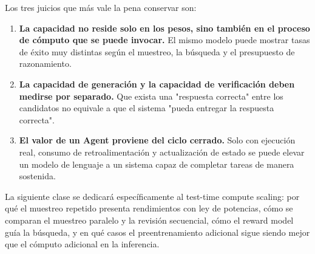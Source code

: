 \documentclass[a4paper]{article}
\begin{document}
Los tres juicios que más vale la pena conservar son:

\begin{enumerate}
    \item \textbf{La capacidad no reside solo en los pesos, sino también en el proceso de cómputo que se puede invocar.} El mismo modelo puede mostrar tasas de éxito muy distintas según el muestreo, la búsqueda y el presupuesto de razonamiento.
    \item \textbf{La capacidad de generación y la capacidad de verificación deben medirse por separado.} Que exista una "respuesta correcta" entre los candidatos no equivale a que el sistema "pueda entregar la respuesta correcta".
    \item \textbf{El valor de un Agent proviene del ciclo cerrado.} Solo con ejecución real, consumo de retroalimentación y actualización de estado se puede elevar un modelo de lenguaje a un sistema capaz de completar tareas de manera sostenida.
\end{enumerate}

La siguiente clase se dedicará específicamente al test-time compute scaling: por qué el muestreo repetido presenta rendimientos con ley de potencias, cómo se comparan el muestreo paralelo y la revisión secuencial, cómo el reward model guía la búsqueda, y en qué casos el preentrenamiento adicional sigue siendo mejor que el cómputo adicional en la inferencia.
\end{document}

